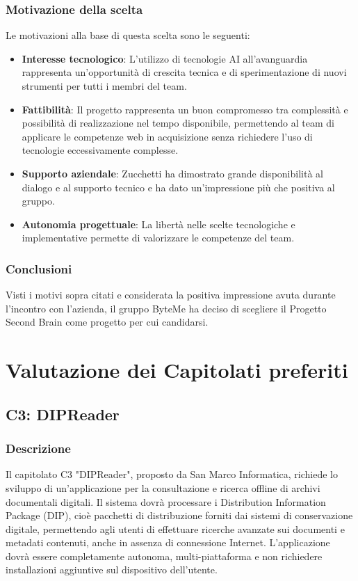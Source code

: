 \documentclass[11pt,a4paper]{article}
\begin{document}
\subsubsection{Motivazione della scelta}
Le motivazioni alla base di questa scelta sono le seguenti:
\begin{itemize}
    \item \textbf{Interesse tecnologico}: L'utilizzo di tecnologie AI all'avanguardia rappresenta un'opportunità di crescita tecnica e di sperimentazione di nuovi strumenti per tutti i membri del team.
    \item \textbf{Fattibilità}: Il progetto rappresenta un buon compromesso tra complessità e possibilità di realizzazione nel tempo disponibile, permettendo al team di applicare le competenze web in acquisizione senza richiedere l'uso di tecnologie eccessivamente complesse.
    \item \textbf{Supporto aziendale}: Zucchetti ha dimostrato grande disponibilità al dialogo e al supporto tecnico e ha dato un'impressione più che positiva al gruppo.
    \item \textbf{Autonomia progettuale}: La libertà nelle scelte tecnologiche e implementative permette di valorizzare le competenze del team.
\end{itemize}

\subsubsection{Conclusioni}
Visti i motivi sopra citati e considerata la positiva impressione avuta durante l'incontro con l'azienda, il gruppo ByteMe ha deciso di scegliere il Progetto Second Brain come progetto per cui candidarsi.

\newpage
\section{Valutazione dei Capitolati preferiti}

\subsection{C3: DIPReader}

\subsubsection{Descrizione}
Il capitolato C3 "DIPReader", proposto da San Marco Informatica, richiede lo sviluppo di un'applicazione per la consultazione e ricerca offline di archivi documentali digitali. Il sistema dovrà processare i Distribution Information Package (DIP), cioè pacchetti di distribuzione forniti dai sistemi di conservazione digitale, permettendo agli utenti di effettuare ricerche avanzate sui documenti e metadati contenuti, anche in assenza di connessione Internet. L'applicazione dovrà essere completamente autonoma, multi-piattaforma e non richiedere installazioni aggiuntive sul dispositivo dell'utente.
\end{document}
